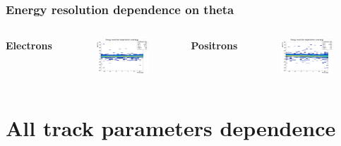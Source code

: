 \documentclass{beamer}
\begin{document}
		\begin{frame}
			\frametitle{Energy resolution dependence on theta}
			\begin{columns}
				\centering
				\Large \textbf{Electrons}
				\begin{figure}
					\centering
					\includegraphics[width = 0.95 \linewidth]{../images/c_e_deltaenergy_theta.png}
				\end{figure}
				\centering
				\Large \textbf{Positrons}
				\begin{figure}
					\centering
					\includegraphics[width = 0.95 \linewidth]{../images/c_p_deltaenergy_theta.png}
				\end{figure}
			\end{columns}
		\end{frame}
	
	\section{All track parameters dependence}
	
\end{document}
